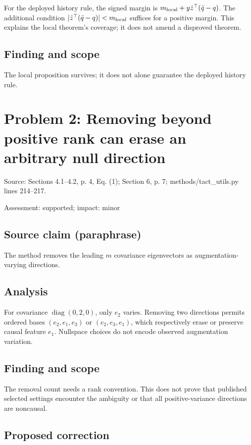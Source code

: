 \documentclass[11pt]{article}
\begin{document}
For the deployed history rule, the signed margin is \(m_{\rm local}+y\hat z^\top(\bar q-q)\). The additional condition \(|\hat z^\top(\bar q-q)|<m_{\rm local}\) suffices for a positive margin. This explains the local theorem’s coverage; it does not amend a disproved theorem.

\subsection*{Finding and scope}

The local proposition survives; it does not alone guarantee the deployed history rule.

\section*{Problem 2: Removing beyond positive rank can erase an arbitrary null direction}

Source: Sections 4.1–4.2, p. 4, Eq. (1); Section 6, p. 7; methods/tact\_utils.py lines 214–217.

Assessment: supported; impact: minor

\subsection*{Source claim (paraphrase)}

The method removes the leading \(m\) covariance eigenvectors as augmentation-varying directions.

\subsection*{Analysis}

For covariance \(\operatorname{diag}(0,2,0)\), only \(e_2\) varies. Removing two directions permits ordered bases \((e_2,e_1,e_3)\) or \((e_2,e_3,e_1)\), which respectively erase or preserve causal feature \(e_1\). Nullspace choices do not encode observed augmentation variation.

\subsection*{Finding and scope}

The removal count needs a rank convention. This does not prove that published selected settings encounter the ambiguity or that all positive-variance directions are noncausal.

\subsection*{Proposed correction}
\end{document}
